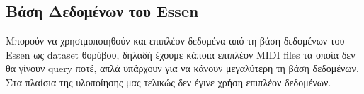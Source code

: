 \subsection{Βάση Δεδομένων του Essen}
Μπορούν να χρησιμοποιηθούν και επιπλέον δεδομένα από τη βάση δεδομένων του Essen\cite{esac-dataset}
ως dataset θορύβου, δηλαδή έχουμε κάποια επιπλέον MIDI files τα οποία δεν θα
γίνουν query ποτέ, απλά υπάρχουν για να κάνουν μεγαλύτερη τη βάση δεδομένων. Στα πλαίσια της υλοποίησης μας τελικώς δεν έγινε χρήση επιπλέον δεδομένων.
